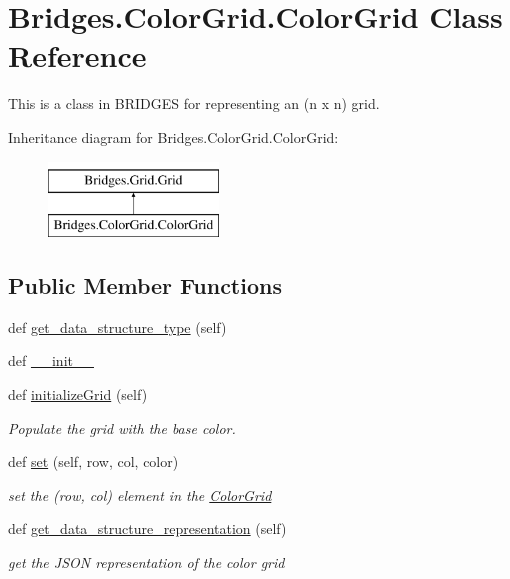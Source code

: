 \hypertarget{class_bridges_1_1_color_grid_1_1_color_grid}{}\section{Bridges.\+Color\+Grid.\+Color\+Grid Class Reference}
\label{class_bridges_1_1_color_grid_1_1_color_grid}


This is a class in B\+R\+I\+D\+G\+E\+S for representing an (n x n) grid.  


Inheritance diagram for Bridges.\+Color\+Grid.\+Color\+Grid\+:\begin{figure}[H]
\begin{center}
\leavevmode
\includegraphics[height=2.000000cm]{class_bridges_1_1_color_grid_1_1_color_grid}
\end{center}
\end{figure}
\subsection*{Public Member Functions}
\begin{DoxyCompactItemize}
\item 
def \hyperlink{class_bridges_1_1_color_grid_1_1_color_grid_a34e609e12f3f5fa2bf8917b2bd2b5489}{get\+\_\+data\+\_\+structure\+\_\+type} (self)
\item 
def \hyperlink{class_bridges_1_1_color_grid_1_1_color_grid_aa4665bcaf163d8462490168db83313be}{\+\_\+\+\_\+init\+\_\+\+\_\+}
\item 
def \hyperlink{class_bridges_1_1_color_grid_1_1_color_grid_add4d644d5a7703acf2569a6fdd95f814}{initialize\+Grid} (self)
\begin{DoxyCompactList}\small\item\em Populate the grid with the base color. \end{DoxyCompactList}\item 
def \hyperlink{class_bridges_1_1_color_grid_1_1_color_grid_a0389bb1397a02cc665214f91e9c359a2}{set} (self, row, col, color)
\begin{DoxyCompactList}\small\item\em set the (row, col) element in the \hyperlink{class_bridges_1_1_color_grid_1_1_color_grid}{Color\+Grid} \end{DoxyCompactList}\item 
def \hyperlink{class_bridges_1_1_color_grid_1_1_color_grid_a995dc5674b9fb6c405cd78f5db78f3ab}{get\+\_\+data\+\_\+structure\+\_\+representation} (self)
\begin{DoxyCompactList}\small\item\em get the J\+S\+O\+N representation of the color grid \end{DoxyCompactList}\end{DoxyCompactItemize}
